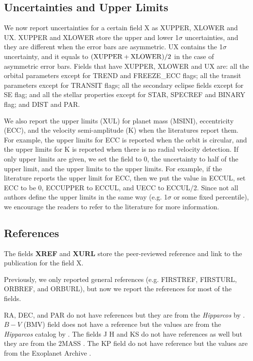 \documentclass[11pt,preprint]{aastex}
\begin{document}
\begin{CJK*}{UTF8}{gbsn}
\subsection{Uncertainties and Upper Limits}\label{sec:unc}

We now report uncertainties for a certain field X as XUPPER, XLOWER
and UX. XUPPER and XLOWER store the upper and lower 1$\sigma$
uncertainties, and they are different when the error bars are
asymmetric. UX contains the 1$\sigma$ uncertainty, and it equals to
$({\rm XUPPER+XLOWER})/2$ in the case of asymmetric error bars. Fields
that have XUPPER, XLOWER and UX are: all the orbital parameters except
for TREND and FREEZE\_ECC flags; all the transit parameters except for
TRANSIT flags; all the secondary eclipse fields except for SE flag;
and all the stellar properties except for STAR, SPECREF and BINARY
flag; and DIST and PAR.

We also report the upper limits (XUL) for planet mass (MSINI),
eccentricity (ECC), and the velocity semi-amplitude (K) when the
literatures report them. For example, the upper limits for ECC is
reported when the orbit is circular, and the upper limits for K is
reported when there is no radial velocity detection. If only upper
limits are given, we set the field to 0, the uncertainty to half of
the upper limit, and the upper limits to the upper limits. For
example, if the literature reports the upper limit for ECC, then we
put the value in ECCUL, set ECC to be 0, ECCUPPER to ECCUL, and UECC
to ECCUL/2. Since not all authors define the upper limits in the same
way (e.g. 1$\sigma$ or some fixed percentile), we encourage the
readers to refer to the literature for more information.

\subsection{References}\label{sec:ref}

The fields {\bf XREF} and {\bf XURL} store the peer-reviewed reference
and link to the publication for the field X.

Previously, we only reported general references (e.g. FIRSTREF,
FIRSTURL, ORBREF, and ORBURL), but now we report the references for
most of the fields.

RA, DEC, and PAR do not have references but they are from the
\textit{Hipparcos} by \cite{van Leeuwen2009}. $B-V$ (BMV) field does
not have a reference but the values are from the \textit{Hipparcos}
catalog by \cite{Perryman1997}. The fields J H and KS do not have
references as well but they are from the 2MASS
\citep{Skrutskie2006}. The KP field do not have reference but the
values are from the Exoplanet Archive \citep{Akeson2013}.


\end{CJK*}
\end{document}
